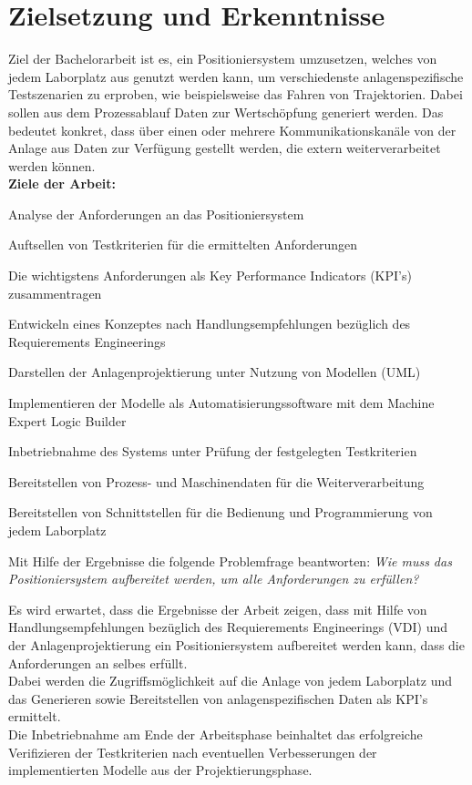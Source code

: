 \documentclass[12pt, a4paper, twoside]{article} %
\begin{document}
\section{Zielsetzung und Erkenntnisse}
Ziel der Bachelorarbeit ist es, ein Positioniersystem umzusetzen, welches von jedem Laborplatz aus genutzt werden kann, um verschiedenste anlagenspezifische Testszenarien zu erproben, wie beispielsweise das Fahren von Trajektorien. Dabei sollen aus dem Prozessablauf Daten zur Wertschöpfung generiert werden. Das bedeutet konkret, dass über einen oder mehrere Kommunikationskanäle von der Anlage aus Daten zur Verfügung gestellt werden, die extern weiterverarbeitet werden können.\\
\textbf{Ziele der Arbeit:}
\begin{compactitem}
	\item Analyse der Anforderungen an das Positioniersystem
	\item Auftsellen von Testkriterien für die ermittelten Anforderungen
	\item Die wichtigstens Anforderungen als Key Performance Indicators (KPI's) zusammentragen
	\item Entwickeln eines Konzeptes nach Handlungsempfehlungen bezüglich des Requierements Engineerings
	\item Darstellen der Anlagenprojektierung unter Nutzung von Modellen (UML)
	\item Implementieren der Modelle als Automatisierungssoftware mit dem \glqq Machine Expert Logic Builder\grqq{}
	\item Inbetriebnahme des Systems unter Prüfung der festgelegten Testkriterien
	\item Bereitstellen von Prozess- und Maschinendaten für die Weiterverarbeitung
	\item Bereitstellen von Schnittstellen für die Bedienung und Programmierung von jedem Laborplatz
	\item Mit Hilfe der Ergebnisse die folgende Problemfrage beantworten: \textit{Wie muss das Positioniersystem aufbereitet werden, um alle Anforderungen zu erfüllen?}
\end{compactitem}
Es wird erwartet, dass die Ergebnisse der Arbeit zeigen, dass mit Hilfe von Handlungsempfehlungen bezüglich des Requierements Engineerings (VDI) und der Anlagenprojektierung ein Positioniersystem aufbereitet werden kann, dass die Anforderungen an selbes erfüllt.\\
Dabei werden die Zugriffsmöglichkeit auf die Anlage von jedem Laborplatz und das Generieren sowie Bereitstellen von anlagenspezifischen Daten als KPI's ermittelt.\\
Die Inbetriebnahme am Ende der Arbeitsphase beinhaltet das erfolgreiche Verifizieren der Testkriterien nach eventuellen Verbesserungen der implementierten Modelle aus der Projektierungsphase.
\end{document}

